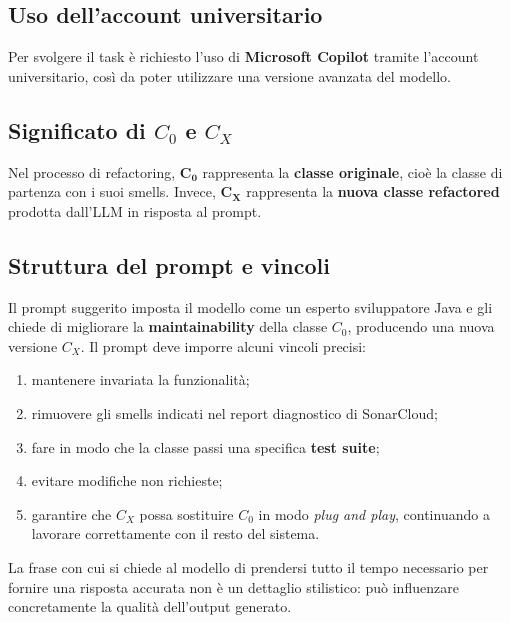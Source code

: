 \subsection{Uso dell'account universitario}

Per svolgere il task è richiesto l'uso di \textbf{Microsoft Copilot} tramite l'account universitario, così da poter utilizzare una versione avanzata del modello.

\subsection{Significato di \(C_0\) e \(C_X\)}

Nel processo di refactoring, \(\mathbf{C_0}\) rappresenta la \textbf{classe originale}, cioè la classe di partenza con i suoi smells. Invece, \(\mathbf{C_X}\) rappresenta la \textbf{nuova classe refactored} prodotta dall'LLM in risposta al prompt.

\subsection{Struttura del prompt e vincoli}

Il prompt suggerito imposta il modello come un esperto sviluppatore Java e gli chiede di migliorare la \textbf{maintainability} della classe \(C_0\), producendo una nuova versione \(C_X\). Il prompt deve imporre alcuni vincoli precisi:

\begin{enumerate}
    \item mantenere invariata la funzionalità;
    \item rimuovere gli smells indicati nel report diagnostico di SonarCloud;
    \item fare in modo che la classe passi una specifica \textbf{test suite};
    \item evitare modifiche non richieste;
    \item garantire che \(C_X\) possa sostituire \(C_0\) in modo \emph{plug and play}, continuando a lavorare correttamente con il resto del sistema.
\end{enumerate}

\begin{notaprof}
La frase con cui si chiede al modello di prendersi tutto il tempo necessario per fornire una risposta accurata non è un dettaglio stilistico: può influenzare concretamente la qualità dell'output generato.
\end{notaprof}


